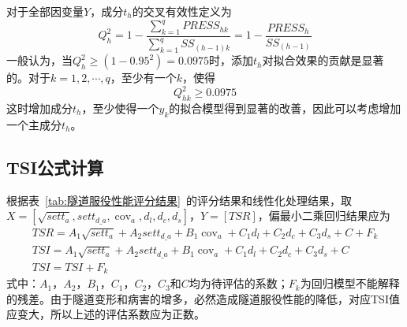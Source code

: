 对于全部因变量$Y$，成分$t_h$的交叉有效性定义为
\begin{equation}
    Q_{h}^{2}=1-\frac{\sum\limits_{k=1}^{q}{PRES{{S}_{hk}}}}{\sum\limits_{k=1}^{q}{S{{S}_{(h-1)k}}}}=1-\frac{PRES{{S}_{h}}}{S{{S}_{(h-1)}}}
\end{equation}
一般认为，当$Q_{h}^{2}\ge (1-{{0.95}^{2}})=0.0975$时，添加$t_h$对拟合效果的贡献是显著的。对于$k=1,2,\cdots ,q$，至少有一个$k$，使得
\begin{equation}
    Q_{hk}^{2}\ge 0.0975
\end{equation}
这时增加成分$t_h$，至少使得一个$y_k$的拟合模型得到显著的改善，因此可以考虑增加一个主成分$t_h$。

\subsection{TSI公式计算}

根据表~\ref{tab:隧道服役性能评分结果}~的评分结果和线性化处理结果，取$X=\left[ \sqrt{set{{t}_{a}}},set{{t}_{d\_a}},{{\operatorname{cov}}_{a}},{{d}_{l}},{{d}_{c}},{{d}_{s}} \right]$，$Y=\left[ TSR \right]$，偏最小二乘回归结果应为
\begin{gather}
    TSR={{A}_{1}}\sqrt{set{{t}_{a}}}+{{A}_{2}}set{{t}_{d\_a}}+{{B}_{1}}{{\operatorname{cov}}_{a}}+{{C}_{1}}{{d}_{l}}+{{C}_{2}}{{d}_{c}}+{{C}_{3}}{{d}_{s}}+C+{{F}_{k}} \\ 
    TSI={{A}_{1}}\sqrt{set{{t}_{a}}}+{{A}_{2}}set{{t}_{d\_a}}+{{B}_{1}}{{\operatorname{cov}}_{a}}+{{C}_{1}}{{d}_{l}}+{{C}_{2}}{{d}_{c}}+{{C}_{3}}{{d}_{s}}+C \\ 
    TSI=TSI+{{F}_{k}}
\end{gather}
式中：$A_1$，$A_2$，$B_1$，$C_1$，$C_2$，$C_3$和$C$均为待评估的系数；$F_k$为回归模型不能解释的残差。由于隧道变形和病害的增多，必然造成隧道服役性能的降低，对应TSI值应变大，所以上述的评估系数应为正数。

